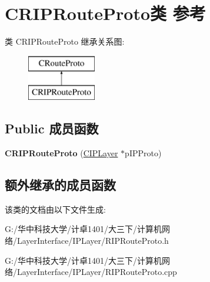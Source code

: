 \hypertarget{class_c_r_i_p_route_proto}{}\section{C\+R\+I\+P\+Route\+Proto类 参考}
\label{class_c_r_i_p_route_proto}
类 C\+R\+I\+P\+Route\+Proto 继承关系图\+:\begin{figure}[H]
\begin{center}
\leavevmode
\includegraphics[height=2.000000cm]{class_c_r_i_p_route_proto}
\end{center}
\end{figure}
\subsection*{Public 成员函数}
\begin{DoxyCompactItemize}
\item 
\mbox{\label{class_c_r_i_p_route_proto_a75e098dbb570322ad14aba1ea6e06adb}} 
{\bfseries C\+R\+I\+P\+Route\+Proto} (\hyperlink{class_c_i_p_layer}{C\+I\+P\+Layer} $\ast$p\+I\+P\+Proto)
\end{DoxyCompactItemize}
\subsection*{额外继承的成员函数}


该类的文档由以下文件生成\+:\begin{DoxyCompactItemize}
\item 
G\+:/华中科技大学/计卓1401/大三下/计算机网络/\+Layer\+Interface/\+I\+P\+Layer/R\+I\+P\+Route\+Proto.\+h\item 
G\+:/华中科技大学/计卓1401/大三下/计算机网络/\+Layer\+Interface/\+I\+P\+Layer/R\+I\+P\+Route\+Proto.\+cpp\end{DoxyCompactItemize}
